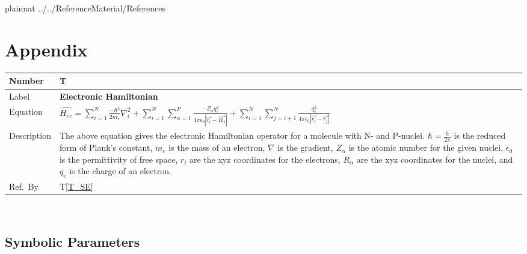 \documentclass[12pt]{article}
\newcommand{\colAwidth}{0.13\textwidth}
\newcommand{\colBwidth}{0.82\textwidth}
\newcounter{theorynum} %
\newcommand{\tref}[1]{T\ref{#1}}
\begin{document}
\newpage

 {plainnat}
%
 {../../ReferenceMaterial/References}

\newpage

\section{Appendix} \label{appendix}


\noindent
\begin{minipage}{\textwidth}
	\renewcommand*{\arraystretch}{1.5}
	\begin{tabular}{| p{\colAwidth} | p{\colBwidth}|}
		\hline
		\rowcolor[gray]{0.9}
		Number & T{theorynum}\thetheorynum \label{T_HAMEE}\\	
		\hline
		Label&\bf Electronic Hamiltonian \\
		\hline
		Equation&  $\hat{H_{ee}} = 
		\sum\limits_{i=1}^{N}\frac{-\hbar^2}{2m_e}\nabla_i^2 + 
		\sum\limits_{i=1}^{N} 
		\sum\limits_{\alpha=1}^{P}\frac{-Z_\alpha 
			q_e^2}{4\pi\epsilon_0|\overrightarrow{r_i}-\overrightarrow{R_\alpha}|}
			 + 
		\sum\limits_{i=1}^{N}\sum\limits_{j=i+1}^{N}\frac{q_e^2}{4\pi\epsilon_0|\overrightarrow{r_i}-\overrightarrow{r_j}|}
		$ \\
		\hline
		Description & 
		The above equation gives the electronic 
		Hamiltonian operator for a 
		molecule with N-\ce{e-} and P-nuclei. $\hbar = \frac{h}{2\pi}$ is the 
		reduced form of Plank's constant, $m_e$ is the mass of an electron, 
		$\nabla$ is the gradient, $Z_\alpha$ is the atomic number for the given 
		nuclei, $\epsilon_0$ is the permittivity of free space, $r_i$ are the 
		xyz coordinates for the electrons, $R_\alpha$ are the xyz coordinates 
		for the nuclei, and $q_e$ is the charge of an electron.
		\\
		\hline
		Ref.\ By & \tref{T_SE}\\
		\hline
	\end{tabular}
\end{minipage}\\

\subsection{Symbolic Parameters}

\end{document}

